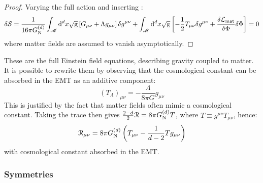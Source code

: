 \begin{proofbox}
  \begin{proof}
    Varying the full action and inserting :
    \begin{equation*}
      \delta \mathcal{S} = \frac{1}{16\pi G_\text{N}^{(d)}} \int_\mathscr{M} \mathrm{d}^d x \sqrt{\mathrm{g}} \left[ G_{\mu \nu} + \Lambda g_{\mu \nu} \right] \delta g^{\mu \nu} + \int_\mathscr{M} \mathrm{d}^d x \sqrt{\mathrm{g}} \left[ - \frac{1}{2} T_{\mu \nu} \delta g^{\mu \nu} + \frac{\delta \mathcal{L}_\text{mat}}{\delta \Phi} \delta \Phi \right] = 0
    \end{equation*}
    where matter fields are assumed to vanish asymptotically.
  \end{proof}
\end{proofbox}

These are the full Einstein field equations, describing gravity coupled to matter. It is possible to rewrite them by observing that the cosmological constant can be absorbed in the EMT as an additive component:
\begin{equation}
  (T_\Lambda)_{\mu \nu} = - \frac{\Lambda}{8\pi G} g_{\mu \nu}
  \label{eq:lambda-emt}
\end{equation}
This is justified by the fact that matter fields often mimic a cosmological constant. Taking the trace then gives $ \frac{2 - d}{2} \EuScript{R} = 8\pi G_\text{N}^{(d)} T $, where $ T \equiv g^{\mu \nu} T_{\mu \nu} $, hence:
\begin{equation}
  \EuScript{R}_{\mu \nu} = 8\pi G_\text{N}^{(d)} \left( T_{\mu \nu} - \frac{1}{d-2} T g_{\mu \nu} \right)
  \label{eq:ef-eq-alt}
\end{equation}
with cosmological constant absorbed in the EMT.

\subsubsection{Symmetries}

